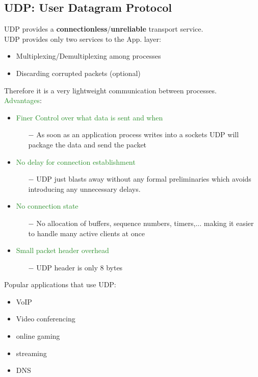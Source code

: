\documentclass[a4paper, fontsize=8pt, landscape, DIV=1]{scrartcl}
\begin{document}
\begin{multicols*}{4}
		\subsection{UDP: User Datagram Protocol}
		UDP provides a \textbf{connectionless}/\textbf{unreliable} transport service.\\
		UDP provides only two services to the App. layer:
		\begin{itemize}[noitemsep]
			\item Multiplexing/Demultiplexing among processes
			\item Discarding corrupted packets (optional)
		\end{itemize}
		Therefore it is a very lightweight communication between processes.\\
		\textcolor{ForestGreen}{Advantages}: 
		\vspace{-0.2cm}
		\begin{itemize}[noitemsep]
			\item \textcolor{ForestGreen}{Finer Control over what data is sent and when}
			\begin{itemize}
				\item[$-$] As soon as an application process writes into a sockets UDP will package the data and send the packet
			\end{itemize}
			\item \textcolor{ForestGreen}{No delay for connection establishment}
			\begin{itemize}
				\item[$-$] UDP just blasts away without any formal preliminaries which avoids introducing any unnecessary delays. 
			\end{itemize}
			\item \textcolor{ForestGreen}{No connection state}
			\begin{itemize}
				\item[$-$] No allocation of buffers, sequence numbers, timers,... making it easier to handle many active clients at once
			\end{itemize}
			\item \textcolor{ForestGreen}{Small packet header overhead}
			\begin{itemize}
				\item[$-$] UDP header is only 8 bytes
			\end{itemize}
		\end{itemize}
		Popular applications that use UDP: 
		\begin{itemize}[noitemsep]
			\item VoIP
			\item Video conferencing
			\item online gaming
			\item streaming
			\item DNS
		\end{itemize}
	

\end{multicols*}
\end{document}
